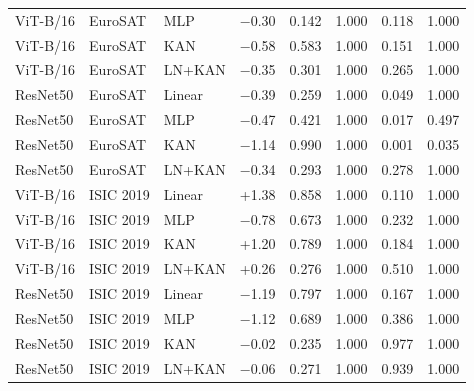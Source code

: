 \documentclass[10pt]{article}
\begin{document}
\begin{longtable}{lllrcrrr}
ViT-B/16 & EuroSAT & MLP & $-$0.30 & 0.142 & 1.000 & 0.118 & 1.000 \\
ViT-B/16 & EuroSAT & KAN & $-$0.58 & 0.583 & 1.000 & 0.151 & 1.000 \\
ViT-B/16 & EuroSAT & LN+KAN & $-$0.35 & 0.301 & 1.000 & 0.265 & 1.000 \\
ResNet50 & EuroSAT & Linear & $-$0.39 & 0.259 & 1.000 & 0.049 & 1.000 \\
ResNet50 & EuroSAT & MLP & $-$0.47 & 0.421 & 1.000 & 0.017 & 0.497 \\
ResNet50 & EuroSAT & KAN & $-$1.14 & 0.990 & 1.000 & 0.001 & 0.035 \\
ResNet50 & EuroSAT & LN+KAN & $-$0.34 & 0.293 & 1.000 & 0.278 & 1.000 \\
ViT-B/16 & ISIC 2019 & Linear & +1.38 & 0.858 & 1.000 & 0.110 & 1.000 \\
ViT-B/16 & ISIC 2019 & MLP & $-$0.78 & 0.673 & 1.000 & 0.232 & 1.000 \\
ViT-B/16 & ISIC 2019 & KAN & +1.20 & 0.789 & 1.000 & 0.184 & 1.000 \\
ViT-B/16 & ISIC 2019 & LN+KAN & +0.26 & 0.276 & 1.000 & 0.510 & 1.000 \\
ResNet50 & ISIC 2019 & Linear & $-$1.19 & 0.797 & 1.000 & 0.167 & 1.000 \\
ResNet50 & ISIC 2019 & MLP & $-$1.12 & 0.689 & 1.000 & 0.386 & 1.000 \\
ResNet50 & ISIC 2019 & KAN & $-$0.02 & 0.235 & 1.000 & 0.977 & 1.000 \\
ResNet50 & ISIC 2019 & LN+KAN & $-$0.06 & 0.271 & 1.000 & 0.939 & 1.000 \\
\end{longtable}
\vspace{-6pt}{\footnotesize Equivalence margin $\pm0.5$ percentage points. The Welch columns test for a difference (exploratory).\par}
\normalsize
\end{document}
